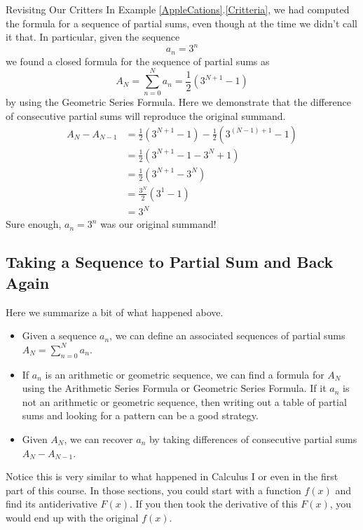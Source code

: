 \begin{example}{Revisitng Our Critters }
In Example \ref{AppleCations}.\ref{Critteria}, we had computed the formula for a sequence of partial sums, even though at the time we didn't call it that.  In particular, given the sequence $$a_n=3^n$$
we found a closed formula for the sequence of partial sums as $$A_N=\sum_{n=0}^Na_n=\frac{1}{2}\left(3^{N+1}-1\right)$$ by using the Geometric Series Formula.  Here we demonstrate that the difference of consecutive partial sums will reproduce the original summand.
\begin{align*}
A_N-A_{N-1}&=\frac{1}{2}\left(3^{N+1}-1\right)-\frac{1}{2}\left(3^{\left(N-1\right)+1}-1\right) \\
&=\frac{1}{2}\left(3^{N+1}-1-3^{N}+1\right) \\
&=\frac{1}{2}\left(3^{N+1}-3^{N}\right) \\
&=\frac{3^N}{2}\left(3^{1}-1\right)\\
&=3^N
\end{align*}
Sure enough, $a_n=3^n$ was our original summand!
\end{example}

\subsection{Taking a Sequence to Partial Sum and Back Again}

Here we summarize a bit of what happened above. 
\begin{itemize}
\item Given a sequence $a_n$, we can define an associated sequences of partial sums $A_N=\sum_{n=0}^Na_n$.
\item If $a_n$ is an arithmetic or geometric sequence, we can find a formula for $A_N$ using the Arithmetic Series Formula or Geometric Series Formula.  If it $a_n$ is not an arithmetic or geometric sequence, then writing out a table of partial sums and looking for a pattern can be a good strategy.
\item Given $A_N$, we can recover $a_n$ by taking differences of consecutive partial sums $A_{N}-A_{N-1}$.
\end{itemize}

Notice this is very similar to what happened in Calculus I or even in the first part of this course.  In those sections, you could start with a function $f(x)$ and find its antiderivative $F(x)$.  If you then took the derivative of this $F(x)$, you would end up with the original $f(x)$. 

